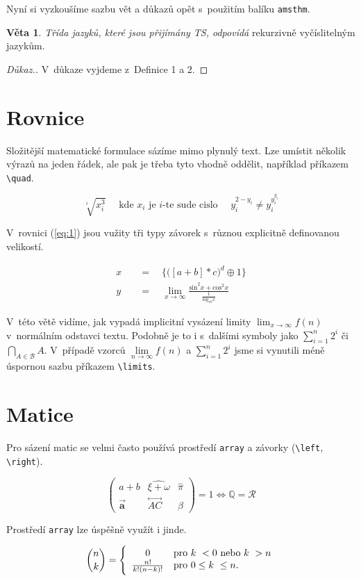 \documentclass[11pt, twocolumn]{article}
\theoremstyle{definition}
\newtheorem{lemm}{Věta}
\begin{document}
Nyní si vyzkoušíme sazbu vět a důkazů opět s~použitím balíku \verb!amsthm!.

\begin{lemm} \label{lemm}
\textsl{Třída jazyků, které jsou přijímány TS, odpovídá }rekurzivně vyčíslitelným jazykům.
\end{lemm}

\begin{proof}
[Důkaz.] V~důkaze vyjdeme z~Definice 1 a 2.
\end{proof}

\section{Rovnice}

Složitější matematické formulace sázíme mimo plynulý text. Lze umístit několik výrazů na jeden řádek, ale pak je třeba tyto vhodně oddělit, například příkazem \verb!\quad!.

\begin{equation*}
    \sqrt[i]{x_i^3} \quad
    \mbox{ kde } x_i \mbox{ je }i \mbox{-te sude cislo } \quad
    y_i^{2-y_i} \neq y_i^{y_i^{y_i}}
\end{equation*}

V~rovnici (\ref{eq:1}) jsou vužity tři typy závorek s~různou explicitně definovanou velikostí.

\begin{align}
    x\quad&=\quad\Bigg\{\bigg([a + b] * c\bigg)^d \oplus 1\Bigg\} \label{eq:1} \\
    y\quad&=\quad\lim_{x\to\infty} \frac{\text{sin}^2 x + \text{cos}^2 x}{\frac{1}{\text{log}_{10} x}}
    \label{eq:2}
\end{align}



V~této větě vidíme, jak vypadá implicitní vysázení limity $\lim_{x\to\infty} f(n)$ v~normálním odstavci textu. Podobně je to i s~dalšími symboly jako $\sum_{i=1}^n 2^i$ či $\bigcap_{A \in \mathcal{B}}A$. V~případě vzorců $\lim\limits_{n \to \infty} f(n)$ a $\sum\limits_{i=1}^n 2^i$ jsme si vynutili méně úspornou sazbu příkazem \verb!\limits!.
	
\section{Matice}

Pro sázení matic se velmi často používá prostředí \verb!array! a závorky (\verb!\left!, \verb!\right!).

\[ \left(
\begin{array}{ccc}
a + b& \widehat{\xi + \omega}& \hat{\pi} \\
\vec{\mathbf{a}}& \overset{\longleftrightarrow}{AC}& \beta
\end{array}{}
\right) = 1 \Longleftrightarrow \mathbb{Q} = \mathcal{R}\]

Prostředí \verb!array! lze úspěšně využít i jinde.

\begin{equation*}
   \binom{n}{k} = \Bigg\{
\begin{array}{c l}
    0  &\text{pro } k~< 0 \text{ nebo } k~> n \\
    \frac{n!}{k!(n-k)!} &\text{pro } 0 \leq  k~\leq n.
\end{array}
\end{equation*}
\end{document}
